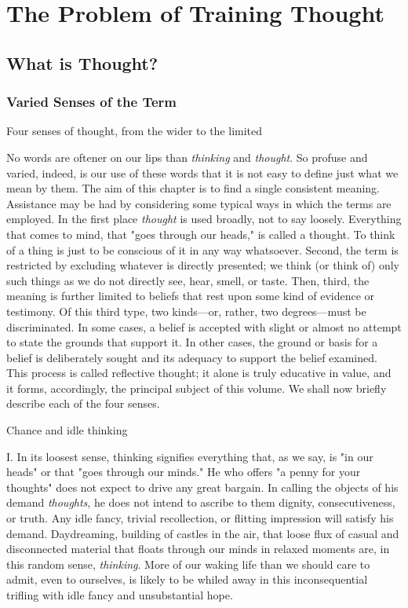 \documentclass[letterpaper]{book}
\begin{document}
\part{The Problem of Training Thought}

\chapter{What is Thought?}

\section{Varied Senses of the Term}

Four senses of thought, from the wider to the limited

No words are oftener on our lips than \emph{thinking} and
\emph{thought}. So profuse and varied, indeed, is our use of these words
that it is not easy to define just what we mean by them. The aim of this
chapter is to find a single consistent meaning. Assistance may be had by
considering some typical ways in which the terms are employed. In the
first place \emph{thought} is used broadly, not to say loosely.
Everything that comes to mind, that "goes through our heads," is called
a thought. To think of a thing is just to be conscious of it in any way
whatsoever. Second, the term is restricted by excluding whatever is
directly presented; we think (or think of) only such things as we do not
directly see, hear, smell, or taste. Then, third, the meaning is further
limited to beliefs that rest upon some kind of evidence or testimony. Of
this third type, two kinds---or, rather, two degrees---must be
discriminated. In some cases, a belief is accepted with slight or almost
no attempt to state the grounds that support it. In other cases, the
ground or basis for a belief is deliberately sought and
its
adequacy to support the belief examined. This process is called
reflective thought; it alone is truly educative in value, and it forms,
accordingly, the principal subject of this volume. We shall now briefly
describe each of the four senses.

Chance and idle thinking

I. In its loosest sense, thinking signifies everything that, as we say,
is "in our heads" or that "goes through our minds." He who offers "a
penny for your thoughts" does not expect to drive any great bargain. In
calling the objects of his demand \emph{thoughts}, he does not intend to
ascribe to them dignity, consecutiveness, or truth. Any idle fancy,
trivial recollection, or flitting impression will satisfy his demand.
Daydreaming, building of castles in the air, that loose flux of casual
and disconnected material that floats through our minds in relaxed
moments are, in this random sense, \emph{thinking}. More of our waking
life than we should care to admit, even to ourselves, is likely to be
whiled away in this inconsequential trifling with idle fancy and
unsubstantial hope.
\end{document}
